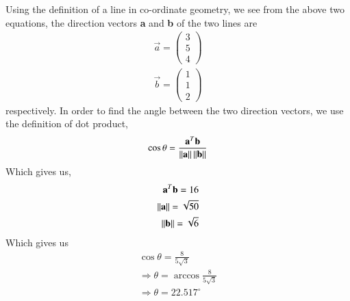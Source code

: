  Using the definition of a line in co-ordinate geometry, we see from the above two equations, the direction vectors \textbf{a} and \textbf{b} of the two lines are
 \begin{align}
 \vec{a} = 
 \begin{pmatrix}
 3\\
  5\\
  4
 \end{pmatrix}
\\
  \vec{b} = 
 \begin{pmatrix}
 1\\
  1\\
  2
 \end{pmatrix}
 \end{align}
 respectively.
 In order to find the angle between the two direction vectors, we use the definition of dot product,
 \begin{equation}
 \cos{\theta} = \frac{\mathbf{a}^T\mathbf{b}}{\left\lVert\textbf{a}\right\rVert\left\lVert\textbf{b}\right\rVert}
 \end{equation}
 Which gives us,
 \begin{align}
 \mathbf{a}^T\mathbf{b} = 16
 \\
 \left\lVert\textbf{a}\right\rVert = \sqrt{50}
 \\  
 \left\lVert\textbf{b}\right\rVert = \sqrt{6}
 \end{align}
 Which gives us 
 \begin{align}
 \cos{\theta} = \frac{8}{5\sqrt{3}}
 \\
  \Longrightarrow \theta = \arccos{\frac{8}{5\sqrt{3}}}
  \\
  \Longrightarrow \theta = 22.517^{\circ}
 \end{align}
